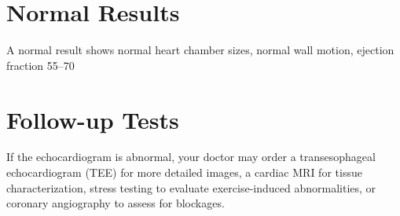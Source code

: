 \section*{Normal Results}
A normal result shows normal heart chamber sizes, normal wall motion, ejection fraction 55--70%
\section*{Follow-up Tests}
If the echocardiogram is abnormal, your doctor may order a transesophageal echocardiogram (TEE) for more detailed images, a cardiac MRI for tissue characterization, stress testing to evaluate exercise-induced abnormalities, or coronary angiography to assess for blockages.
